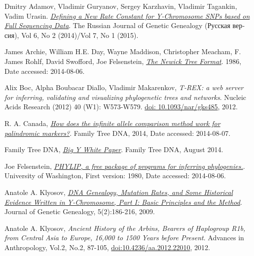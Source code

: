 \raggedright
\begin{thebibliography}{bla}

 Dmitry Adamov, Vladimir Guryanov,
Sergey Karzhavin, Vladimir Tagankin, Vadim Urasin.
\emph{\href{http://rjgg.molgen.org/index.php/RJGGRE/article/view/151}
{Defining a New Rate Constant for Y-Chromosome SNPs based on Full Sequencing Data}}.
The Russian Journal of Genetic Genealogy
(\foreignlanguage{russian}{Русская версия}),
Vol 6, No 2 (2014)/Vol 7, No 1 (2015).

 James Archie, William H.E. Day, Wayne Maddison,
Christopher Meacham, F. James Rohlf, David Swofford, Joe Felsenstein,
\emph{\href{http://evolution.genetics.washington.edu/phylip/newicktree.html}
{The Newick Tree Format}}.
1986, Date accessed: 2014-08-06.

 Alix Boc, Alpha Boubacar Diallo, Vladimir Makarenkov,
\emph{T-REX: a web server for inferring, validating and
visualizing phylogenetic trees and networks}.
Nucleic Acids Research (2012) 40 (W1): W573-W579.
\href{http://dx.doi.org/10.1093/nar/gks485}{doi: 10.1093/nar/gks485}, 2012. 

 R. A. Canada,
\emph{\href{https://www.familytreedna.com/learn/y-dna-testing/y-str/infinite-allele-palindromic-markers/}
{How does the infinite allele comparison method work for palindromic markers?}}.
Family Tree DNA, 2014, Date accessed: 2014-08-07.

 Family Tree DNA,
\emph{\href{https://www.familytreedna.com/learn/wp-content/uploads/2014/08/BIG_Y_WhitePager.pdf}{Big Y White Paper}}.
Family Tree DNA, August 2014.

 Joe Felsenstein,
\emph{\href{http://evolution.genetics.washington.edu/phylip.html}
{PHYLIP, a free package of programs for inferring phylogenies.}}.
University of Washington, First version: 1980, Date accessed: 2014-08-06.

 Anatole A. Klyosov,
\emph{\href{http://www.jogg.info/52/files/Klyosov1.pdf}
{DNA Genealogy, Mutation Rates, and Some Historical
Evidence Written in Y-Chromosome, Part I:  Basic Principles and
the Method}}.
Journal of Genetic Genealogy, 5(2):186-216, 2009.

 Anatole A. Klyosov,
\emph{Ancient History of the Arbins, Bearers of Haplogroup R1b, from
Central Asia to Europe, 16,000 to 1500 Years before Present}.
Advances in Anthropology, Vol.2, No.2, 87-105,
\href{http://dx.doi.org/10.4236/aa.2012.22010}{doi:10.4236/aa.2012.22010}, 2012.


\end{thebibliography}
